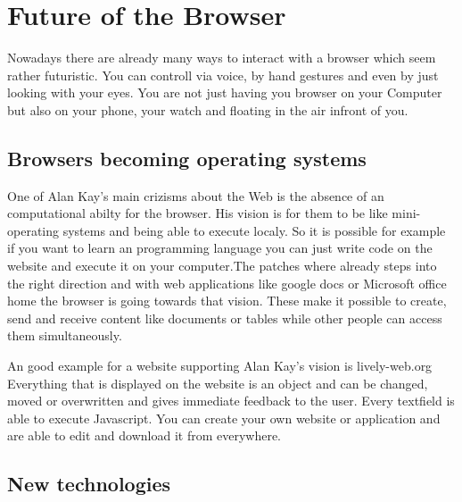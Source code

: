 \documentclass[runningheads]{llncs}
\begin{document}
	\section{Future of the Browser}
	Nowadays there are already many ways to interact with a browser which seem rather futuristic. You can controll via voice, by hand gestures and even by just looking with your eyes. You are not just having you browser on your Computer but also on your phone, your watch and floating in the air infront of you.
		\subsection{Browsers becoming operating systems}
		One of Alan Kay's main crizisms about the Web is the absence of an computational abilty for the browser. His vision is for them to be like  mini-operating systems and being able to execute localy. So it is possible for example if you want to learn an programming language you can just write code on the website and execute it on your computer.The patches where already steps into the right direction and with web applications like google docs or Microsoft office home the browser is going towards that vision. These make it possible to create, send and receive content like documents or tables while other people can access them simultaneously.

		An good example for a website supporting Alan Kay's vision is lively-web.org
		Everything that is displayed on the website is an object and can be changed, moved or overwritten and gives immediate feedback to the user. Every textfield is able to execute Javascript. You can create your own website or application and are able to edit and download it from everywhere.
		\subsection{New technologies}
\end{document}
